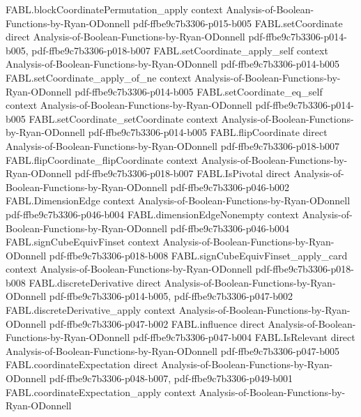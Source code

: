 \begin{theorem}
\proofstep
  {FABL.blockCoordinatePermutation_apply}
  {context}
  {Analysis-of-Boolean-Functions-by-Ryan-ODonnell}
  {pdf-ffbe9c7b3306-p015-b005}
\proofstep
  {FABL.setCoordinate}
  {direct}
  {Analysis-of-Boolean-Functions-by-Ryan-ODonnell}
  {pdf-ffbe9c7b3306-p014-b005,
    pdf-ffbe9c7b3306-p018-b007}
\proofstep
  {FABL.setCoordinate_apply_self}
  {context}
  {Analysis-of-Boolean-Functions-by-Ryan-ODonnell}
  {pdf-ffbe9c7b3306-p014-b005}
\proofstep
  {FABL.setCoordinate_apply_of_ne}
  {context}
  {Analysis-of-Boolean-Functions-by-Ryan-ODonnell}
  {pdf-ffbe9c7b3306-p014-b005}
\proofstep
  {FABL.setCoordinate_eq_self}
  {context}
  {Analysis-of-Boolean-Functions-by-Ryan-ODonnell}
  {pdf-ffbe9c7b3306-p014-b005}
\proofstep
  {FABL.setCoordinate_setCoordinate}
  {context}
  {Analysis-of-Boolean-Functions-by-Ryan-ODonnell}
  {pdf-ffbe9c7b3306-p014-b005}
\proofstep
  {FABL.flipCoordinate}
  {direct}
  {Analysis-of-Boolean-Functions-by-Ryan-ODonnell}
  {pdf-ffbe9c7b3306-p018-b007}
\proofstep
  {FABL.flipCoordinate_flipCoordinate}
  {context}
  {Analysis-of-Boolean-Functions-by-Ryan-ODonnell}
  {pdf-ffbe9c7b3306-p018-b007}
\proofstep
  {FABL.IsPivotal}
  {direct}
  {Analysis-of-Boolean-Functions-by-Ryan-ODonnell}
  {pdf-ffbe9c7b3306-p046-b002}
\proofstep
  {FABL.DimensionEdge}
  {context}
  {Analysis-of-Boolean-Functions-by-Ryan-ODonnell}
  {pdf-ffbe9c7b3306-p046-b004}
\proofstep
  {FABL.dimensionEdgeNonempty}
  {context}
  {Analysis-of-Boolean-Functions-by-Ryan-ODonnell}
  {pdf-ffbe9c7b3306-p046-b004}
\proofstep
  {FABL.signCubeEquivFinset}
  {context}
  {Analysis-of-Boolean-Functions-by-Ryan-ODonnell}
  {pdf-ffbe9c7b3306-p018-b008}
\proofstep
  {FABL.signCubeEquivFinset_apply_card}
  {context}
  {Analysis-of-Boolean-Functions-by-Ryan-ODonnell}
  {pdf-ffbe9c7b3306-p018-b008}
\proofstep
  {FABL.discreteDerivative}
  {direct}
  {Analysis-of-Boolean-Functions-by-Ryan-ODonnell}
  {pdf-ffbe9c7b3306-p014-b005,
    pdf-ffbe9c7b3306-p047-b002}
\proofstep
  {FABL.discreteDerivative_apply}
  {context}
  {Analysis-of-Boolean-Functions-by-Ryan-ODonnell}
  {pdf-ffbe9c7b3306-p047-b002}
\proofstep
  {FABL.influence}
  {direct}
  {Analysis-of-Boolean-Functions-by-Ryan-ODonnell}
  {pdf-ffbe9c7b3306-p047-b004}
\proofstep
  {FABL.IsRelevant}
  {direct}
  {Analysis-of-Boolean-Functions-by-Ryan-ODonnell}
  {pdf-ffbe9c7b3306-p047-b005}
\proofstep
  {FABL.coordinateExpectation}
  {direct}
  {Analysis-of-Boolean-Functions-by-Ryan-ODonnell}
  {pdf-ffbe9c7b3306-p048-b007,
    pdf-ffbe9c7b3306-p049-b001}
\proofstep
  {FABL.coordinateExpectation_apply}
  {context}
  {Analysis-of-Boolean-Functions-by-Ryan-ODonnell}

\end{theorem}
